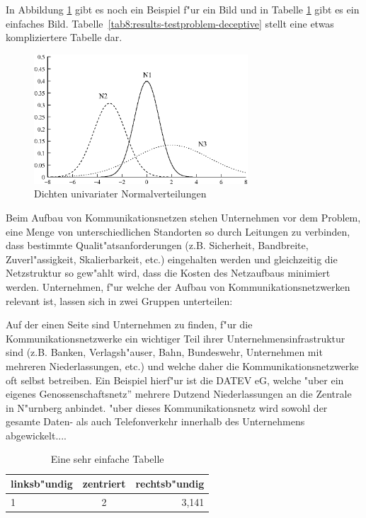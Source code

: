 In Abbildung \ref{fig:2dnorm} gibt es noch ein Beispiel f"ur ein Bild und in Tabelle \ref{tab:einfache-tabelle} gibt es ein einfaches Bild. Tabelle~\ref{tab8:results-testproblem-deceptive} stellt eine etwas kompliziertere Tabelle dar. 
\begin{figure}[htb]
        \begin{center}
        \includegraphics[width=8cm]{grafiken/norm_uni}
        \caption{Dichten univariater Normalverteilungen}
        \label{fig:2dnorm}
        \end{center}
\end{figure}


Beim Aufbau von Kommunikationsnetzen stehen Unternehmen vor dem Problem, eine Menge von unterschiedlichen Standorten so durch Leitungen zu verbinden, dass bestimmte Qualit"atsanforderungen (z.B. Sicherheit, Bandbreite, Zu\-ver\-l"assig\-keit, Skalierbarkeit, etc.) eingehalten werden und gleichzeitig die Netzstruktur so gew"ahlt wird, dass die Kosten des Netzaufbaus minimiert werden. Unternehmen, f"ur welche der Aufbau von Kommunikationsnetzwerken relevant ist, lassen sich in zwei Gruppen unterteilen:

Auf der einen Seite sind Unternehmen zu finden, f"ur die Kommunikationsnetzwerke ein wichtiger Teil ihrer Unternehmensinfrastruktur sind (z.B. Banken, Verlagsh"auser, Bahn, Bundeswehr, Unternehmen mit mehreren Niederlassungen, etc.) und welche daher die Kommunikationsnetzwerke oft selbst betreiben. Ein Beispiel hierf"ur ist die DATEV eG, welche "uber ein eigenes \glqq Genossenschaftsnetz'' mehrere Dutzend Niederlassungen an die Zentrale in N"urnberg anbindet. "uber dieses Kommunikationsnetz wird sowohl der gesamte Daten- als auch Telefonverkehr innerhalb des Unternehmens abgewickelt....






\begin{table}
\caption{Eine sehr einfache Tabelle\label{tab:einfache-tabelle}}
\begin{center}
\begin{tabular}{|l|c|r|}
\hline
linksb"undig & zentriert & rechtsb"undig \\
\hline
1 & 2 & 3,141\\
\hline
\end{tabular}
\end{center}
\end{table}


